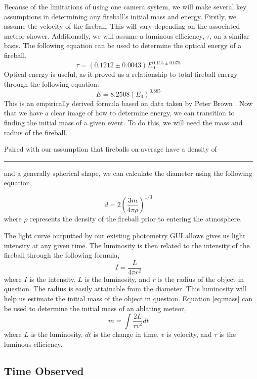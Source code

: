 Because of the limitations of using one camera system, we will make several key assumptions in determining any fireball's initial mass and energy.  
Firstly, we assume the velocity of the fireball.
This will vary depending on the associated meteor shower.
Additionally, we will assume a luminous efficiency, $\tau$, on a similar basis.
The following equation can be used to determine the optical energy of a fireball.
$$
\tau = (0.1212 \pm 0.0043)E_0^{0.115 \pm 0.075}
$$
Optical energy is useful, as it proved us a relationship to total fireball energy through the following equation.
$$ E = 8.2508(E_0)^0.885$$
This is an empirically derived formula based on data taken by Peter Brown \cite{brown_p_flux_2002}.  
Now that we have a clear image of how to determine energy, we can transition to finding the initial mass of a given event.
To do this, we will need the mass and radius of the fireball.

Paired with our assumption that fireballs on average have a density of \rule{1cm}{.1pt} and a generally spherical shape, we can calculate the diameter using the following equation,

$$d = 2(\frac{3m}{4\pi \rho})^{1/3}$$
where $\rho$ represents the density of the fireball prior to entering the atmosphere.


The light curve outputted by our existing photometry GUI allows gives us light intensity at any given time.
The luminosity is then related to the intensity of the fireball through the following formula,
$$ I = \frac{L}{4 \pi r^2}$$
where $I$ is the intensity, $L$ is the luminosity, and $r$ is the radius of the object in question.  
The radius is easily attainable from the diameter.
This luminosity will help us estimate the initial mass of the object in question.
Equation \ref{eq:mass} can be used to determine the initial mass of an ablating meteor,
\begin{equation}
m = \int \frac{2L}{\tau v^2} dt
\label{eq:mass}
\end{equation}
where $L$ is the luminosity, $dt$ is the change in time, $v$ is velocity, and $\tau$ is the luminous efficiency. 


\subsection{Time Observed}

